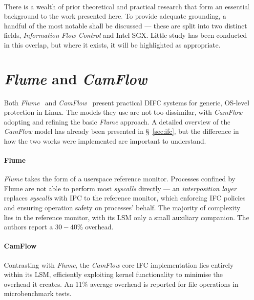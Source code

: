 \paragraph{} There is a wealth of prior theoretical and practical research that form an essential background to the work presented here. To provide adequate grounding, a handful of the most notable shall be discussed --- these are split into two distinct fields, \textit{Information Flow Control} and Intel SGX. Little study has been conducted in this overlap, but where it exists, it will be highlighted as appropriate.


\section{\textit{Flume} and \textit{CamFlow}}

\paragraph{} Both \textit{Flume}~\cite{flume} and \textit{CamFlow}~\cite{camflow} present practical DIFC systems for generic, OS-level protection in Linux. The models they use are not too dissimilar, with \textit{CamFlow} adopting and refining the basic \textit{Flume} approach. A detailed overview of the \textit{CamFlow} model has already been presented in §~\ref{sec:ifc}, but the difference in how the two works were implemented are important to understand.

\paragraph{Flume} \textit{Flume} takes the form of a userspace reference monitor. Processes confined by Flume are not able to perform most \textit{syscalls} directly --- an \textit{interposition layer} replaces \textit{syscalls} with IPC to the reference monitor, which enforcing IFC policies and ensuring operation safety on processes' behalf. The majority of complexity lies in the reference monitor, with its LSM only a small auxiliary companion. The authors report a $30-40$\% overhead.

\paragraph{CamFlow} Contrasting with \textit{Flume}, the \textit{CamFlow} core IFC implementation lies entirely within its LSM, efficiently exploiting kernel functionality to minimise the overhead it creates. An 11\% average overhead is reported for file operations in microbenchmark tests.


